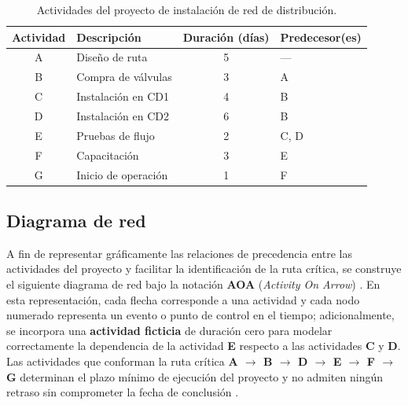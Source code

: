 \documentclass[12pt,a4paper]{article}
\begin{document}
\begin{table}[H]
  \centering
  \begin{tabular}{|c|l|c|l|}
    \hline
    \textbf{Actividad} & \textbf{Descripci\'{o}n} & \textbf{Duraci\'{o}n (d\'{i}as)} & \textbf{Predecesor(es)} \\
    \hline
    A & Dise\~{n}o de ruta       & 5 & --- \\
    B & Compra de v\'{a}lvulas   & 3 & A \\
    C & Instalaci\'{o}n en CD1   & 4 & B \\
    D & Instalaci\'{o}n en CD2   & 6 & B \\
    E & Pruebas de flujo          & 2 & C, D \\
    F & Capacitaci\'{o}n         & 3 & E \\
    G & Inicio de operaci\'{o}n  & 1 & F \\
    \hline
  \end{tabular}
  \caption{Actividades del proyecto de instalaci\'{o}n de red de distribuci\'{o}n.}
\end{table}

\subsection{Diagrama de red}

A fin de representar gr\'{a}ficamente las relaciones de precedencia entre las actividades 
del proyecto y facilitar la identificaci\'{o}n de la ruta cr\'{i}tica, se construye el 
siguiente diagrama de red bajo la notaci\'{o}n \textbf{AOA} (\textit{Activity On Arrow}) 
\cite{render2012,taha2012}. En esta representaci\'{o}n, cada flecha corresponde a una 
actividad y cada nodo numerado representa un evento o punto de control en el tiempo; 
adicionalmente, se incorpora una \textbf{actividad ficticia} de duraci\'{o}n cero para 
modelar correctamente la dependencia de la actividad \textbf{E} respecto a las actividades 
\textbf{C} y \textbf{D}. Las actividades que conforman la ruta cr\'{i}tica 
\textbf{A $\to$ B $\to$ D $\to$ E $\to$ F $\to$ G} determinan el plazo m\'{i}nimo de 
ejecuci\'{o}n del proyecto y no admiten ning\'{u}n retraso sin comprometer la fecha de 
conclusi\'{o}n \cite{hillier2015}.
\end{document}
